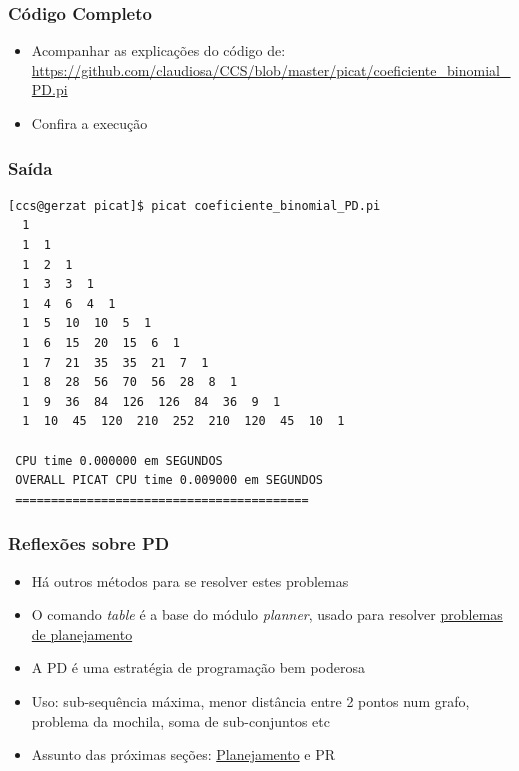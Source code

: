\begin{frame}[fragile]
 \frametitle{Código Completo}

\begin{itemize}
  \item Acompanhar as explicações do código de:\\
\url{https://github.com/claudiosa/CCS/blob/master/picat/coeficiente_binomial_PD.pi}

  \item Confira a execuç\~ao
\end{itemize}
\end{frame}
\begin{frame}[fragile]

\frametitle{Saída}
\begin{footnotesize}
\begin{verbatim}
[ccs@gerzat picat]$ picat coeficiente_binomial_PD.pi 
  1 
  1  1 
  1  2  1 
  1  3  3  1 
  1  4  6  4  1 
  1  5  10  10  5  1 
  1  6  15  20  15  6  1 
  1  7  21  35  35  21  7  1 
  1  8  28  56  70  56  28  8  1 
  1  9  36  84  126  126  84  36  9  1 
  1  10  45  120  210  252  210  120  45  10  1 

 CPU time 0.000000 em SEGUNDOS 
 OVERALL PICAT CPU time 0.009000 em SEGUNDOS  
 =========================================
\end{verbatim}

\end{footnotesize}    

\end{frame}

\begin{frame}[fragile]
\frametitle{Reflexões sobre PD}


\begin{itemize}
  \item Há outros métodos para se resolver estes problemas

  \pause
  \item O comando \textit{table} é a base do módulo \textit{planner},
  usado para resolver \underline{problemas de planejamento}

  \pause
  \item A PD é uma estratégia de programação bem poderosa
  
  \pause
  \item Uso: sub-sequência máxima, menor distância entre 2 pontos num grafo, 
    problema da mochila,   soma de sub-conjuntos etc
        
  \pause
  \item Assunto das próximas seções:  \underline{Planejamento} e PR

  
\end{itemize}

\end{frame}

